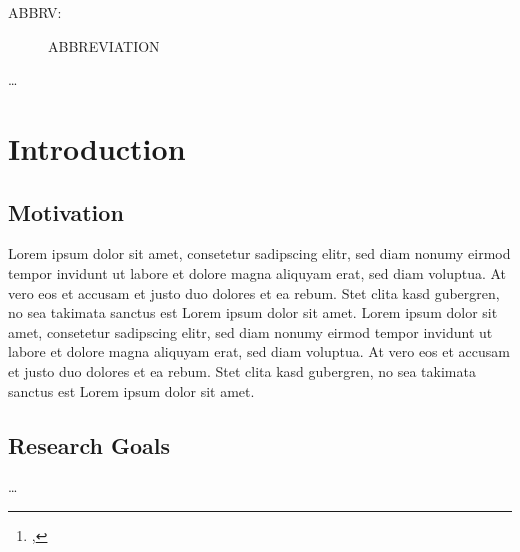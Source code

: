 \documentclass[12pt,toc=bib,toc=listof]{scrreprt}
\title{\reprttopic}
\author{\reprtstudentname\footnote{\reprtstudentid, \reprtstudentmail}}
\begin{document}
\maketitle
{}

\tableofcontents

\label{sec:listofabbrv}

\begin{description}
  \item[ABBRV:] ABBREVIATION 
\end{description}

\listoffigures
\listoftables

\onehalfspacing

\label{cha:management_summary}
\ldots

\newpage
{}

\chapter{Introduction} %
\label{sec:introduction}

\section{Motivation} %
\label{sec:motivation}

Lorem ipsum dolor sit amet, consetetur sadipscing elitr, sed diam nonumy eirmod
tempor invidunt ut labore et dolore magna aliquyam erat, sed diam voluptua. At
vero eos et accusam et justo duo dolores et ea rebum. Stet clita kasd
gubergren, no sea takimata sanctus est Lorem ipsum dolor sit amet. Lorem ipsum
dolor sit amet, consetetur sadipscing elitr, sed diam nonumy eirmod tempor
invidunt ut labore et dolore magna aliquyam erat, sed diam voluptua. At vero
eos et accusam et justo duo dolores et ea rebum. Stet clita kasd gubergren, no
sea takimata sanctus est Lorem ipsum dolor sit amet.


\section{Research Goals} %
\label{sec:research_goals}

\ldots
\end{document}
